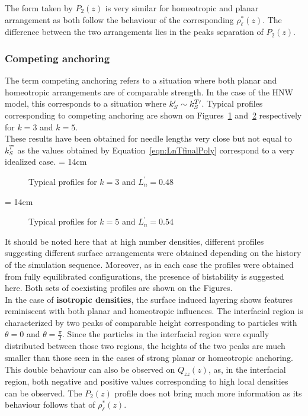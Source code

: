 The form taken by $P_2(z)$ is very similar for homeotropic and planar arrangement as both follow
the behaviour of the corresponding $\rho^{*}_\ell(z)$. The difference between the two
arrangements lies in the peaks separation of $P_2(z)$.


\subsubsection{Competing anchoring}

The term competing anchoring refers to a situation where both planar and homeotropic
arrangements  are of comparable strength. In the case of the HNW model, this corresponds to a 
situation where $k_S^{\prime} \sim k_S^{T\prime}$. Typical profiles corresponding to competing anchoring are
shown on Figures~\ref{fig:typicalProfile_k3_bist} and~\ref{fig:typicalProfile_k5_bist}
respectively for $k=3$ and $k=5$.\\
These results have been obtained for needle lengths very close but not equal to $k_S^{T\prime}$ as the
values obtained by Equation~\ref{eqn:LnTfinalPoly} correspond to a very idealized case.
%
%
\picW = 14cm
\begin{figure}[!]
        \centering
	\caption{Typical profiles for $k=3$ and $L^{'}_n = 0.48$}
	\label{fig:typicalProfile_k3_bist}
\end{figure}
%
\picW = 14cm
\begin{figure}[!]
        \centering
	\caption{Typical profiles for $k=5$ and $L^{'}_n = 0.54$}
	\label{fig:typicalProfile_k5_bist}
\end{figure}

It should be noted here that at high number densities, different profiles suggesting different
surface arrangements were obtained depending on the history of the simulation sequence.
Moreover, as in each case the profiles were obtained from fully equilibrated configurations, the
presence of bistability is suggested here. Both sets of coexisting profiles are shown on the Figures.\\

In the case of \textbf{isotropic densities}, the surface induced layering shows features
reminiscent with
both planar and homeotropic influences. The interfacial region is characterized by two peaks 
of comparable height corresponding to particles with $\theta = 0$ and $\theta = \frac{\pi}{2}$. 
Since the
particles in the interfacial region were equally distributed between those two regions, the
heights of
the two peaks are much smaller than those seen in the cases of strong planar or homeotropic anchoring. 
%
This double behaviour can also be observed on $Q_{zz}(z)$, as, in the interfacial region, 
both negative and positive values corresponding to high local densities can be observed.
%
The $P_2(z)$ profile does not bring much more information as its behaviour follows that of
$\rho^{*}_\ell(z)$.\\


